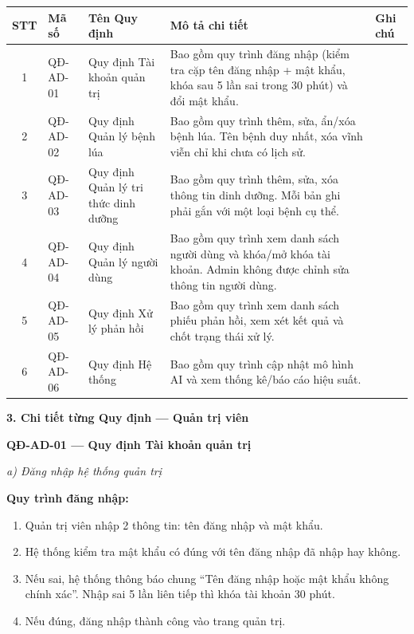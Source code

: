 \documentclass[12pt,a4paper]{article}
\begin{document}
\begin{longtable}{|c|l|l|p{7.5cm}|l|}
    \hline
    \rowcolor{headerblue}
    \textbf{STT} & \textbf{Mã số} & \textbf{Tên Quy định}                & \textbf{Mô tả chi tiết}                                                                                                & \textbf{Ghi chú} \\
    \hline
    \endhead
    1            & QĐ-AD-01       & Quy định Tài khoản quản trị          & Bao gồm quy trình đăng nhập (kiểm tra cặp tên đăng nhập + mật khẩu, khóa sau 5 lần sai trong 30 phút) và đổi mật khẩu. &                  \\
    \hline
    2            & QĐ-AD-02       & Quy định Quản lý bệnh lúa            & Bao gồm quy trình thêm, sửa, ẩn/xóa bệnh lúa. Tên bệnh duy nhất, xóa vĩnh viễn chỉ khi chưa có lịch sử.                &                  \\
    \hline
    3            & QĐ-AD-03       & Quy định Quản lý tri thức dinh dưỡng & Bao gồm quy trình thêm, sửa, xóa thông tin dinh dưỡng. Mỗi bản ghi phải gắn với một loại bệnh cụ thể.                  &                  \\
    \hline
    4            & QĐ-AD-04       & Quy định Quản lý người dùng          & Bao gồm quy trình xem danh sách người dùng và khóa/mở khóa tài khoản. Admin không được chỉnh sửa thông tin người dùng. &                  \\
    \hline
    5            & QĐ-AD-05       & Quy định Xử lý phản hồi              & Bao gồm quy trình xem danh sách phiếu phản hồi, xem xét kết quả và chốt trạng thái xử lý.                              &                  \\
    \hline
    6            & QĐ-AD-06       & Quy định Hệ thống                    & Bao gồm quy trình cập nhật mô hình AI và xem thống kê/báo cáo hiệu suất.                                               &                  \\
    \hline
\end{longtable}

\vspace{0.3cm}
\textbf{3. Chi tiết từng Quy định --- Quản trị viên}

\vspace{0.3cm}
\noindent\textbf{QĐ-AD-01 --- Quy định Tài khoản quản trị}

\noindent\textit{a) Đăng nhập hệ thống quản trị}

\noindent\textbf{Quy trình đăng nhập:}
\begin{enumerate}
    \item Quản trị viên nhập 2 thông tin: tên đăng nhập và mật khẩu.
    \item Hệ thống kiểm tra mật khẩu có đúng với tên đăng nhập đã nhập hay không.
    \item Nếu sai, hệ thống thông báo chung ``Tên đăng nhập hoặc mật khẩu không chính xác''. Nhập sai 5 lần liên tiếp thì khóa tài khoản 30 phút.
    \item Nếu đúng, đăng nhập thành công vào trang quản trị.
\end{enumerate}
\end{document}
